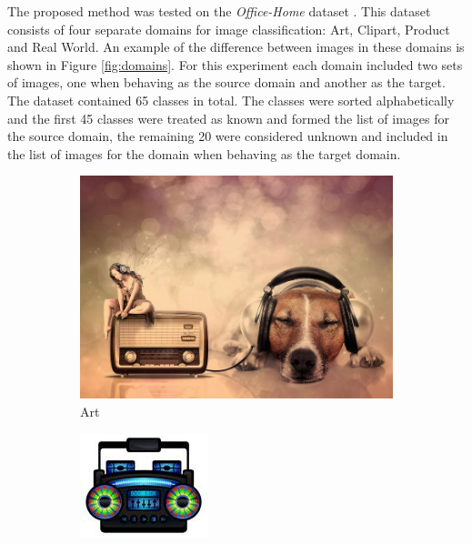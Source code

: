 \documentclass[10pt,twocolumn,letterpaper]{article}
\begin{document}
The proposed method was tested on the \textit{Office-Home} dataset \cite{OfficeHome}. This dataset consists of four separate domains for image classification: Art, Clipart, Product and Real World. An example of the difference between images in these domains is shown in Figure \ref{fig:domains}. For this experiment each domain included two sets of images, one when behaving as the source domain and another as the target. The dataset contained 65 classes in total.  The classes were sorted alphabetically and the first 45 classes were treated as known and formed the list of images for the source domain, the remaining 20 were considered unknown and included in the list of images for the domain when behaving as the target domain.

\begin{figure}[!htbp]
  \centering
  \begin{adjustbox}{minipage=\linewidth,scale=0.8}
  \begin{subfigure}[b]{0.45\columnwidth}
    \centering
    \includegraphics[width=\linewidth]{Figures/Art_Radio.jpg}
    \caption{Art}
    \label{fig:short-a}
  \end{subfigure}
  \hfill
  \begin{subfigure}[b]{0.45\columnwidth}
\centering
    \includegraphics[width=\linewidth]{Figures/Clipart_Radio.jpg}

\end{subfigure}
\end{adjustbox}
\end{figure}
\end{document}

